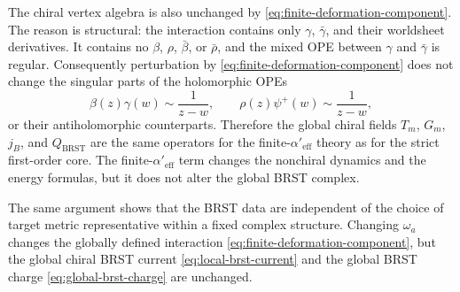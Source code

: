 \documentclass[11pt]{article}
\newcommand{\Aeff}{\alpha'_{\mathrm{eff}}}
\begin{document}
The chiral vertex algebra is also unchanged by \eqref{eq:finite-deformation-component}. The reason is structural: the interaction contains only $\gamma$, $\bar\gamma$, and their worldsheet derivatives. It contains no $\beta$, $\rho$, $\bar\beta$, or $\bar\rho$, and the mixed OPE between $\gamma$ and $\bar\gamma$ is regular. Consequently perturbation by \eqref{eq:finite-deformation-component} does not change the singular parts of the holomorphic OPEs
\begin{equation}\label{eq:chiral-opes-unchanged}
\beta(z)\gamma(w)\sim \frac{1}{z-w},
\qquad
\rho(z)\psi^+(w)\sim \frac{1}{z-w},
\end{equation}
or their antiholomorphic counterparts. Therefore the global chiral fields $T_m$, $G_m$, $j_B$, and $Q_{\mathrm{BRST}}$ are the same operators for the finite-$\Aeff$ theory as for the strict first-order core. The finite-$\Aeff$ term changes the nonchiral dynamics and the energy formulas, but it does not alter the global BRST complex.

The same argument shows that the BRST data are independent of the choice of target metric representative within a fixed complex structure. Changing $\omega_a$ changes the globally defined interaction \eqref{eq:finite-deformation-component}, but the global chiral BRST current \eqref{eq:local-brst-current} and the global BRST charge \eqref{eq:global-brst-charge} are unchanged.
\end{document}
